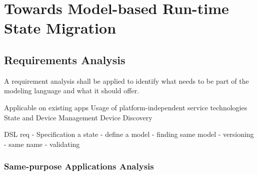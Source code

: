 \chapter{Towards Model-based Run-time State Migration}
\label{ch:requirements}

\section{Requirements Analysis}

A requirement analysis shall be applied to identify what needs to be part of the modeling language and what it should offer.

Applicable on existing apps
 Usage of platform-independent service technologies
State and Device Management
Device Discovery

DSL req
- Specification a state
    - define a model
- finding same model
    - versioning
    - same name
- validating


\subsection{Same-purpose Applications Analysis}

